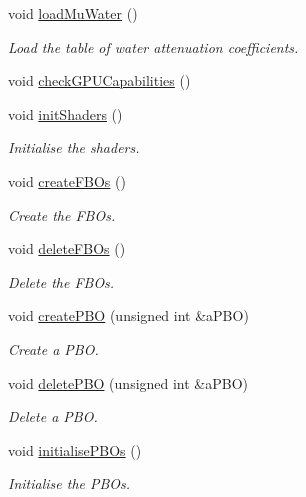 \begin{DoxyCompactItemize}
\item 
void \hyperlink{classg_virtual_x_ray_1_1_x_ray_renderer_a1a5573eb584f679e9c1128ce500e943e}{loadMuWater} ()
\begin{DoxyCompactList}\small\item\em Load the table of water attenuation coefficients. \end{DoxyCompactList}\item 
void \hyperlink{classg_virtual_x_ray_1_1_x_ray_renderer_a5bbcfdeb612308a24c2c357fe64b1503}{checkGPUCapabilities} ()
\item 
void \hyperlink{classg_virtual_x_ray_1_1_x_ray_renderer_ae991fabec12a82228e5f678ef4c85305}{initShaders} ()
\begin{DoxyCompactList}\small\item\em Initialise the shaders. \end{DoxyCompactList}\item 
void \hyperlink{classg_virtual_x_ray_1_1_x_ray_renderer_a08f781173c61d93a46a5b3f1b76cf87b}{createFBOs} ()
\begin{DoxyCompactList}\small\item\em Create the FBOs. \end{DoxyCompactList}\item 
void \hyperlink{classg_virtual_x_ray_1_1_x_ray_renderer_a16ab1d2c97a7ac98a9f8a9e5c161d18b}{deleteFBOs} ()
\begin{DoxyCompactList}\small\item\em Delete the FBOs. \end{DoxyCompactList}\item 
void \hyperlink{classg_virtual_x_ray_1_1_x_ray_renderer_a3e578c0b4e93b04a5cb495b23ca4ec29}{createPBO} (unsigned int \&aPBO)
\begin{DoxyCompactList}\small\item\em Create a PBO. \end{DoxyCompactList}\item 
void \hyperlink{classg_virtual_x_ray_1_1_x_ray_renderer_ace71e81ac4d981e1c3474e5afabbb2d2}{deletePBO} (unsigned int \&aPBO)
\begin{DoxyCompactList}\small\item\em Delete a PBO. \end{DoxyCompactList}\item 
void \hyperlink{classg_virtual_x_ray_1_1_x_ray_renderer_ab3dbe6cad45ae0cfedbc49050433bc23}{initialisePBOs} ()
\begin{DoxyCompactList}\small\item\em Initialise the PBOs. \end{DoxyCompactList}\item 

\end{DoxyCompactItemize}
